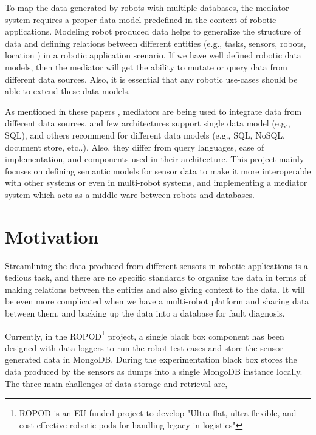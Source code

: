 To map the data generated by robots with multiple databases, the mediator system requires a proper data model predefined in the context of robotic applications. Modeling robot produced data helps to generalize the structure of data and defining relations between different entities (e.g., tasks,  sensors, robots, location ) in a robotic application scenario. If we have well defined robotic data models, then the mediator will get the ability to mutate or query data from different data sources. Also, it is essential that any robotic use-cases should be able to extend these data models.


As mentioned in these papers \cite{ahmed1991pegasus,fahl1993amos,arens1996query,chawathe1994tsimmis,chawathe1994tsimmis,shoens1993rufus}, mediators are being used to integrate data from different data sources, and few architectures support single data model (e.g., SQL), and others recommend for different data models (e.g., SQL, NoSQL, document store, etc..). Also, they differ from query languages, ease of implementation, and components used in their architecture. This project mainly focuses on defining semantic models for sensor data to make it more interoperable with other systems or even in multi-robot systems, and implementing a mediator system which acts as a middle-ware between robots and databases. 

    \section{Motivation}
    
		Streamlining the data produced from different sensors in robotic applications is a tedious task, and there are no specific standards to organize the data in terms of making relations between the entities and also giving context to the data. It will be even more complicated when we have a multi-robot platform and sharing data between them, and backing up the data into a database for fault diagnosis.
		
		Currently, in the ROPOD\footnote{ROPOD is an EU funded project to develop "Ultra-flat, ultra-flexible, and cost-effective robotic pods for handling legacy in logistics"} project, a single black box component has been designed with data loggers to run the robot test cases and store the sensor generated data in MongoDB. During the experimentation black box stores the data produced by the sensors as dumps into a single MongoDB instance locally. The three main challenges of data storage and retrieval are, 
		
